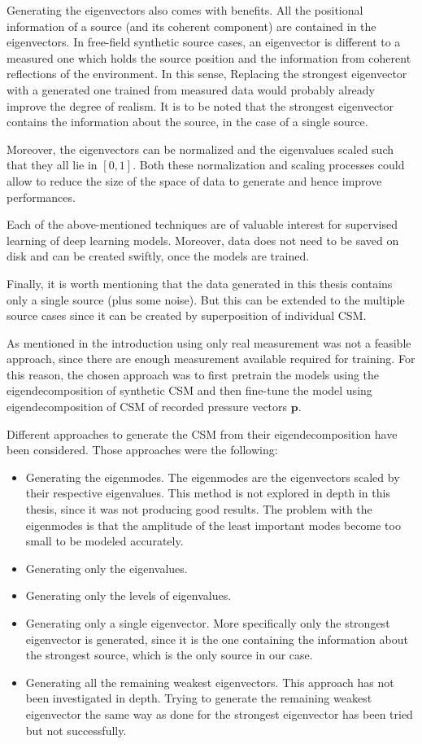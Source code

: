 \documentclass[11pt,a4paper,twoside]{report}
\begin{document}
Generating the eigenvectors also comes with benefits. All the positional information of a source (and its coherent component) are contained in the eigenvectors. In free-field synthetic source cases, an eigenvector is different to a measured one which holds the source position and the information from coherent reflections of the environment. In this sense, Replacing the strongest eigenvector with a generated one trained from measured data would probably already improve the degree of realism. It is to be noted that the strongest eigenvector contains the information about the source, in the case of a single source.

Moreover, the eigenvectors can be normalized and the eigenvalues scaled such that they all lie in $[0,1]$. Both these normalization and scaling processes could allow to reduce the size of the space of data to generate and hence improve performances.

Each of the above-mentioned techniques are of valuable interest for supervised learning of deep learning models. Moreover, data does not need to be saved on disk and can be created swiftly, once the models are trained. 

Finally, it is worth mentioning that the data generated in this thesis contains only a single source (plus some noise). But this can be extended to  the multiple source cases since it can be created by superposition of individual CSM.

As mentioned in the introduction using only real measurement was not a feasible approach, since there are enough measurement available required for training. For this reason, the chosen approach was to first pretrain the models using the eigendecomposition of synthetic CSM and then fine-tune the model using eigendecomposition of CSM of recorded pressure vectors $\mathbf{p}$. 

Different approaches to generate the CSM from their eigendecomposition have been considered. Those approaches were the following:

\begin{itemize}
    \item Generating the eigenmodes. The eigenmodes are the eigenvectors scaled by their respective eigenvalues. This method is not explored in depth in this thesis, since it was not producing good results. The problem with the eigenmodes is that the amplitude of the least important modes become too small to be modeled accurately. 
    \item Generating only the eigenvalues.
    \item Generating only the levels of eigenvalues.
    \item Generating only a single eigenvector. More specifically only the strongest eigenvector is generated, since it is the one containing the information about the strongest source, which is the only source in our case. 
    \item Generating all the remaining weakest eigenvectors. This approach has not been investigated in depth. Trying to generate the remaining weakest eigenvector the same way as done for the strongest eigenvector has been tried but not successfully.  
\end{itemize}
\end{document}

